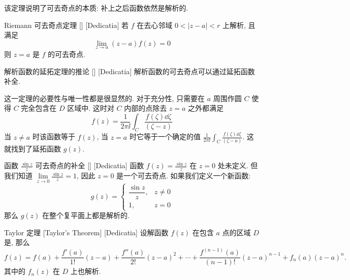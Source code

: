         \begin{rmk}
            [Dedicatia]
            该定理说明了可去奇点的本质: 补上之后函数依然是解析的.
        \end{rmk}

        \begin{ppt}
            {Riemann 可去奇点定理}
            []
            [Dedicatia]
            若 \(f\) 在去心邻域 \(0<|z-a|<r\) 上解析, 且满足
            \[\lim_{z\to a}(z-a)f(z)=0\]
            则 \(z=a\) 是 \(f\) 的可去奇点.
        \end{ppt}

        \begin{crl}
            {解析函数的延拓定理的推论}
            []
            [Dedicatia]
            解析函数的可去奇点可以通过延拓函数补全. 
        \end{crl}

        \begin{prf}
            这一定理的必要性与唯一性都是很显然的. 对于充分性, 只需要在 \(a\) 周围作圆 \(C\) 使得 \(C\) 完全包含在 \(D\) 区域中. 这时对 \(C\) 内部的点除去 \(z=a\) 之外都满足
            \[f(z)=\frac{1}{2\pi\ii}\int_C \frac{f(\zeta)\dd{\zeta}}{(\zeta-z)}\]
            当 \(z\neq a\) 时该函数等于 \(f(z)\), 当 \(z=a\) 时它等于一个确定的值 \(\frac{1}{2\pi\ii}\int_C \frac{f(\zeta)\dd{\zeta}}{(\zeta-a)}\). 这就找到了延拓函数 \(g(z)\).
        \end{prf}

        \begin{xmp}
            {函数 \(\frac{\sin z}{z}\) 可去奇点的补全}
            []
            [Dedicatia]
            函数 \(f(z) = \frac{\sin z}{z}\) 在 \(z = 0\) 处未定义. 但我们知道 \(\lim\limits_{z \to 0} \frac{\sin z}{z} = 1\), 因此 \(z=0\) 是一个可去奇点. 如果我们定义一个新函数: 
            \[
            g(z) = \begin{cases}
            \dfrac{\sin z}{z}, & z \neq 0 \\
            1, & z = 0
            \end{cases}
            \]
            那么 \(g(z)\) 在整个复平面上都是解析的. 
        \end{xmp}

        \begin{thm}
            [Taylor-2]
            {Taylor 定理}
            [Taylor's Theorem]
            [Dedicatia]
            设解函数 \(f(z)\) 在包含 \(a\) 点的区域 \(D\) 是\Analytic{}, 那么
            \[f(z)=f(a)+\frac{f'(a)}{1!}(z-a)+\frac{f''(a)}{2!}(z-a)^2+\cdots+\frac{f^{(n-1)}(a)}{(n-1)!}(z-a)^{n-1}+f_n(a)(z-a)^n.\]
            其中的 \(f_n(z)\) 在 \(D\) 上也解析. 
        \end{thm}

